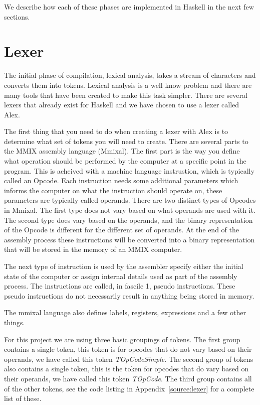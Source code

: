 \documentclass[a4paper,11pt]{report}
\begin{document}
We describe how each of these phases are implemented in Haskell in the next few sections.
\section{Lexer}
The initial phase of compilation, lexical analysis, takes a stream of characters and converts them into tokens. Lexical analysis is a well know problem and there are many tools that have been created to make this task simpler. There are several lexers that already exist for Haskell and we have chosen to use a lexer called Alex\cite{alex}. 

The first thing that you need to do when creating a lexer with Alex is to determine what set of tokens you will need to create. There are several parts to the MMIX assembly language (Mmixal). The first part is the way you define what operation should be performed by the computer at a specific point in the program. This is acheived with a machine language instrustion, which is typically called an Opcode. Each instruction needs some additional parameters which informs the computer on what the instruction should operate on, these parameters are typically called operands. There are two distinct types of Opcodes in Mmixal. The first type does not vary based on what operands are used with it. The second type does vary based on the operands, and the binary representation of the Opcode is different for the different set of operands. At the end of the assembly process these instructions will be converted into a binary representation that will be stored in the memory of an MMIX computer.

The next type of instruction is used by the assembler specify either the initial state of the computer or assign internal details used as part of the assembly process. The instructions are called, in fascile 1\cite{knuth:aocp2}, pseudo instructions. These pseudo instructions do not necessarily result in anything being stored in memory.

The mmixal language also defines labels, registers, expressions and a few other things.

For this project we are using three basic groupings of tokens. The first group contains a single token, this token is for opcodes that do not vary based on their operands, we have called this token \textit{TOpCodeSimple}. The second group of tokens also contains a single token, this is the token for opcodes that do vary based on their operands, we have called this token \textit{TOpCode}. The third group contains all of the other tokens, see the code listing in Appendix~\ref{source:lexer} for a complete list of these.
\end{document}
